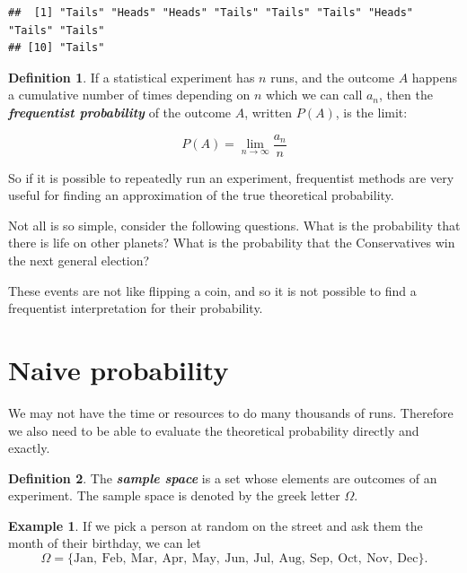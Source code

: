 \documentclass[
]{book}
\theoremstyle{definition}
\newtheorem{definition}{Definition}[chapter]
\theoremstyle{definition}
\newtheorem{example}{Example}[chapter]
\theoremstyle{definition}
\theoremstyle{definition}
\theoremstyle{remark}
\begin{document}
\begin{verbatim}
##  [1] "Tails" "Heads" "Heads" "Tails" "Tails" "Tails" "Heads" "Tails" "Tails"
## [10] "Tails"
\end{verbatim}

\begin{definition}
\protect\hypertarget{def:freq}{}\label{def:freq}If a statistical experiment has \(n\) runs, and the outcome \(A\) happens a cumulative number of times depending on \(n\) which we can call \(a_n\), then the \textbf{\emph{frequentist probability}} of the outcome \(A\), written \(P(A)\), is the limit:

\[P(A) = \lim_{n\to \infty} \frac{a_n}{n}\]
\end{definition}

So if it is possible to repeatedly run an experiment, frequentist methods are very useful for finding an approximation of the true theoretical probability.

Not all is so simple, consider the following questions. What is the probability that there is life on other planets? What is the probability that the Conservatives win the next general election?

These events are not like flipping a coin, and so it is not possible to find a frequentist interpretation for their probability.

\hypertarget{naive-probability}{%
\section{Naive probability}\label{naive-probability}}

We may not have the time or resources to do many thousands of runs. Therefore we also need to be able to evaluate the theoretical probability directly and exactly.

\begin{definition}
\protect\hypertarget{def:samplespace}{}\label{def:samplespace}The \textbf{\emph{sample space}} is a set whose elements are outcomes of an experiment. The sample space is denoted by the greek letter \(\Omega\).
\end{definition}

\begin{example}
\protect\hypertarget{exm:monthspace}{}\label{exm:monthspace}If we pick a person at random on the street and ask them the month of their birthday,
we can let
\[\Omega = \{\text{Jan}, \ \text{Feb}, \ \text{Mar},  \ \text{Apr}, \ \text{May}, \ \text{Jun}, \ \text{Jul}, \ \text{Aug}, \ \text{Sep}, \ \text{Oct}, \ \text{Nov}, \ \text{Dec} \}.\]
\end{example}
\end{document}
